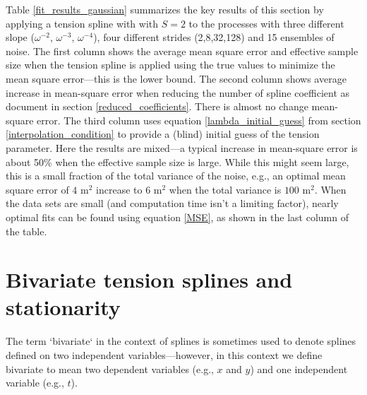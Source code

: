 \documentclass[10pt,journal]{IEEEtran}
\begin{document}
Table \ref{fit_results_gaussian} summarizes the key results of this section by applying a tension spline with with $S=2$ to the processes with three different slope ($\omega^{-2}$, $\omega^{-3}$, $\omega^{-4}$), four different strides (2,8,32,128) and 15 ensembles of noise. The first column shows the average mean square error and effective sample size when the tension spline is applied using the true values to minimize the mean square error---this is the lower bound. The second column shows average increase in mean-square error when reducing the number of spline coefficient as document in section \ref{reduced_coefficients}. There is almost no change mean-square error. The third column uses equation \ref{lambda_initial_guess} from section \ref{interpolation_condition} to provide a (blind) initial guess of the tension parameter. Here the results are mixed---a typical increase in mean-square error is about 50\% when the effective sample size is large. While this might seem large, this is a small fraction of the total variance of the noise, e.g., an optimal mean square error of $4$ m$^2$ increase to $6$ m$^2$ when the total variance is $100$ m$^2$. When the data sets are small (and computation time isn't a limiting factor), nearly optimal fits can be found using equation \ref{MSE}, as shown in the last column of the table.

\section{Bivariate tension splines and stationarity}
\label{sec:bivariate}

The term `bivariate` in the context of splines is sometimes used to denote splines defined on two independent variables---however, in this context we define bivariate to mean two dependent variables (e.g., $x$ and $y$) and one independent variable (e.g., $t$).
\end{document}
